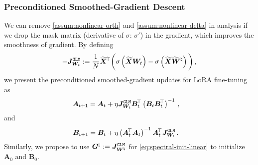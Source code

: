 \subsubsection{Preconditioned Smoothed-Gradient Descent}
\label{prec-smooth-gd}
We can remove \cref{assum:nonlinear-orth} and \cref{assum:nonlinear-delta} in analysis if we drop the mask matrix (derivative of $\sigma$: $\sigma'$) in the gradient, which improves the smoothness of gradient. By defining
\begin{align*}
    -\bm J_{\bm W_t}^{\tt GLM} := \frac{1}{N}\widetilde{\bm X}^{\!\top}\bigg(\sigma\left(\widetilde{\bm X}\bm W_t\right) - \sigma\left(\widetilde{\bm X}\widetilde{\bm W}^\natural\right)\bigg)\,,
\end{align*}
we present the preconditioned smoothed-gradient updates for LoRA fine-tuning as
\begin{align}
    \bm A_{t+1} & = \bm A_t + \eta \bm J_{\bm W_t}^{\tt GLM}\bm B_t^{\!\top}\left(\bm B_t\bm B_t^{\!\top}\right)^{-1}\label{eq:smoth-prec-A}\,,
\end{align}
and
\begin{align}
    \bm B_{t+1} & = \bm B_t + \eta \left(\bm A_t^{\!\top}\bm A_t\right)^{-1}\bm A_t^{\!\top}\bm J_{\bm W_t}^{\tt GLM}\label{eq:smoth-prec-B}\,.
\end{align}
Similarly, we propose to use $\bm G^\natural := \bm J_{\bm W^\natural}^{\tt GLM}$ for \eqref{eq:spectral-init-linear} to initialize $\bm A_0$ and $\bm B_0$.


